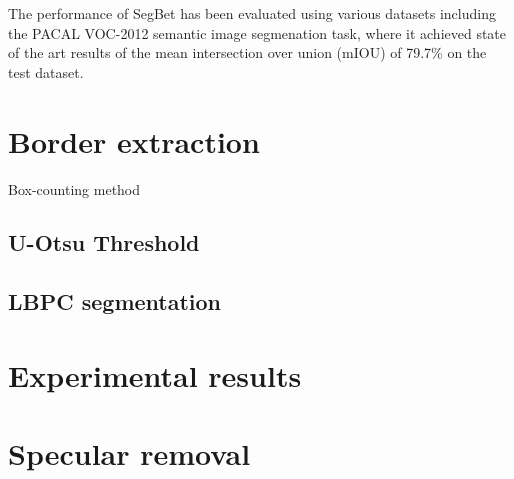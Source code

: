 The performance of SegBet has been evaluated using various datasets including the PACAL VOC-2012 semantic image segmenation task, where it achieved state of the art results of the mean intersection over union (mIOU) of 79.7\% on the test dataset.


\section{Border extraction}
Box-counting method

\subsection{U-Otsu Threshold}

\subsection{LBPC segmentation}

\section{Experimental results}

\section{Specular removal}